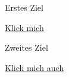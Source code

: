 \documentclass{article}
\begin{document}
\blindtext
{}%
\label{link1}

Erstes Ziel

\blindtext[4]
\hyperref[link1]{Klick mich}
\blindtext[2]

\hypertarget{link2}{Zweites Ziel}

\blindtext[2]
\hyperlink{link2}{Klich mich auch}
\end{document}
